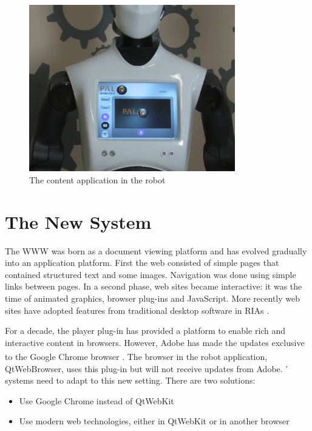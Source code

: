 \begin{figure}[htb]
    \centering
    \includegraphics[width=0.8\textwidth]{figures/demo-app-robot}
    \caption{The content application in the robot}
    \label{fig:demo-app-robot}
\end{figure}



\section{The New System}
The \ac{WWW} was born as a document viewing platform and has evolved gradually into an application platform. 
First the web consisted of simple pages that contained structured text and some images. 
Navigation was done using simple links between pages. 
In a second phase, web sites became interactive: 
it was the time of animated graphics, browser plug-ins and JavaScript. 
More recently web sites have adopted features from traditional desktop software in \acp{RIA} \cite{Anttonen:2011}.

For a decade, the \flash player plug-in has provided a platform to enable rich and interactive content in browsers.
However, Adobe has made the updates exclusive to the Google Chrome\textsuperscript{\textcopyright}\xspace browser \cite{FlashRoadmap}. 
The browser in the robot application, QtWebBrowser, uses this plug-in but will not receive updates from Adobe. \company ' systems need to adapt to this new setting. 
There are two solutions:
\begin{itemize}
	\item Use Google Chrome instead of QtWebKit
	\item Use modern web technologies, either in QtWebKit or in another browser
\end{itemize}

